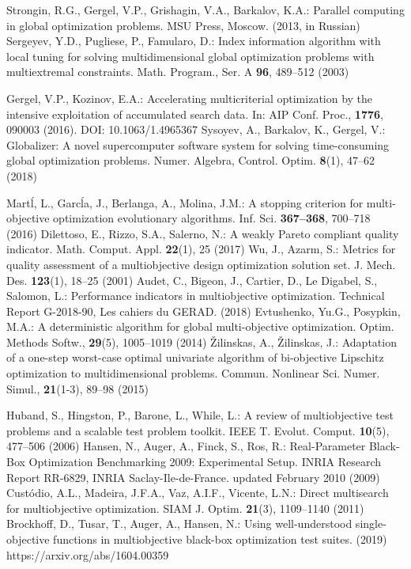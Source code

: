 \documentclass[smallextended]{svjour3}       %
\begin{document}
\begin{thebibliography}{}
 Strongin, R.G., Gergel, V.P., Grishagin, V.A., Barkalov, K.A.: Parallel computing in global optimization problems. MSU Press, Moscow. (2013, in Russian)
 Sergeyev, Y.D., Pugliese, P., Famularo, D.: Index information algorithm with local tuning for solving multidimensional global optimization problems with multiextremal constraints. Math. Program., Ser. A \textbf{96}, 489--512 (2003)


 Gergel, V.P., Kozinov, E.A.: Accelerating multicriterial optimization by the intensive exploitation of accumulated search data. In: 	AIP Conf. Proc., \textbf{1776}, 090003 (2016). DOI: 10.1063/1.4965367
 Sysoyev, A., Barkalov, K., Gergel, V.: Globalizer: A novel supercomputer software system for solving time-consuming global optimization problems. Numer. Algebra, Control. Optim. \textbf{8}(1), 47--62 (2018)


 Mart\'l, L., Garc\'la, J., Berlanga, A., Molina, J.M.: A stopping criterion for multi-objective optimization evolutionary algorithms. Inf. Sci. \textbf{367--368}, 700--718 (2016)
 Dilettoso, E., Rizzo, S.A., Salerno, N.: A weakly Pareto compliant quality indicator. Math. Comput. Appl. \textbf{22}(1), 25 (2017)
 Wu, J., Azarm, S.: Metrics for quality assessment of a multiobjective design optimization solution set. J. Mech. Des. \textbf{123}(1), 18--25 (2001)
 Audet, C., Bigeon, J., Cartier, D., Le Digabel, S., Salomon, L.: Performance indicators in multiobjective optimization. Technical Report G-2018-90, Les cahiers du GERAD. (2018)
 Evtushenko, Yu.G., Posypkin, M.A.: A deterministic algorithm for global multi-objective optimization. Optim. Methods Softw., \textbf{29}(5), 1005--1019 (2014)
 {\v Z}ilinskas, A., {\v Z}ilinskas, J.: Adaptation of a one-step worst-case optimal univariate algorithm of bi-objective Lipschitz optimization to multidimensional problems. Commun. Nonlinear Sci. Numer. Simul., \textbf{21}(1-3), 89--98 (2015)


 Huband, S., Hingston, P., Barone, L., While, L.: A review of multiobjective test problems and a scalable test problem toolkit. IEEE T. Evolut. Comput. \textbf{10}(5), 477--506 (2006)
 Hansen, N., Auger, A., Finck, S., Ros, R.: Real-Parameter Black-Box Optimization Benchmarking 2009: Experimental Setup. INRIA Research Report RR-6829, INRIA Saclay-Ile-de-France. updated February 2010 (2009)
 Cust\'odio, A.L., Madeira, J.F.A., Vaz, A.I.F., Vicente, L.N.: Direct multisearch for multiobjective optimization. SIAM J. Optim. \textbf{21}(3), 1109--1140 (2011)
 Brockhoff, D., Tusar, T., Auger, A., Hansen, N.: Using well-understood single-objective functions in multiobjective black-box optimization test suites. (2019) https://arxiv.org/abs/1604.00359 


\end{thebibliography}
\end{document}
